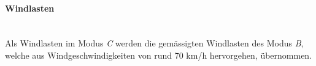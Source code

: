 \paragraph{Windlasten}\mbox{}\\
Als Windlasten im Modus \emph{C} werden die gemässigten Windlasten des Modus \emph{B}, welche aus Windgeschwindigkeiten von rund 70 km/h hervorgehen, übernommen.


